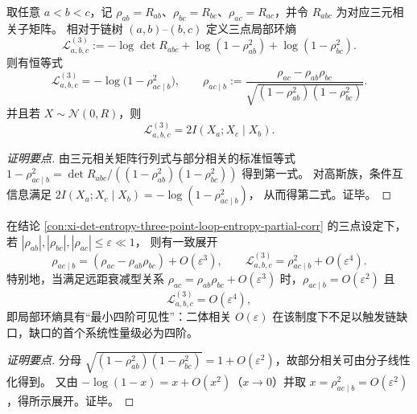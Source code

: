 \begin{conclusion}\label{con:xi-det-entropy-three-point-loop-entropy-partial-corr}
取任意 \(a<b<c\)，记 \(\rho_{ab}=R_{ab}\)、\(\rho_{bc}=R_{bc}\)、\(\rho_{ac}=R_{ac}\)，并令 \(R_{abc}\) 为对应三元相关子矩阵。
相对于链树 \((a,b)\)--\((b,c)\) 定义三点局部环熵
\[
\mathcal L^{(3)}_{a,b,c}
:=-\log\det R_{abc}+\log(1-\rho_{ab}^2)+\log(1-\rho_{bc}^2).
\]
则有恒等式
\[
\mathcal L^{(3)}_{a,b,c}
=-\log\bigl(1-\rho_{ac\mid b}^2\bigr),
\qquad
\rho_{ac\mid b}:=\frac{\rho_{ac}-\rho_{ab}\rho_{bc}}{\sqrt{(1-\rho_{ab}^2)(1-\rho_{bc}^2)}}.
\]
并且若 \(X\sim\mathcal N(0,R)\)，则
\[
\mathcal L^{(3)}_{a,b,c}=2I(X_a;X_c\mid X_b).
\]
\end{conclusion}
\begin{proof}[证明要点]
由三元相关矩阵行列式与部分相关的标准恒等式
\(
1-\rho_{ac\mid b}^2=\det R_{abc}/((1-\rho_{ab}^2)(1-\rho_{bc}^2))
\)
得到第一式。
对高斯族，条件互信息满足
\(
2I(X_a;X_c\mid X_b)=-\log(1-\rho_{ac\mid b}^2)
\)，
从而得第二式。证毕。
\end{proof}

\begin{conclusion}\label{con:xi-det-entropy-q4-trigger-weak-coherence}
在结论 \ref{con:xi-det-entropy-three-point-loop-entropy-partial-corr} 的三点设定下，若
\(
|\rho_{ab}|,|\rho_{bc}|,|\rho_{ac}|\le\varepsilon\ll1
\)，
则有一致展开
\[
\rho_{ac\mid b}=(\rho_{ac}-\rho_{ab}\rho_{bc})+O(\varepsilon^3),
\qquad
\mathcal L^{(3)}_{a,b,c}=\rho_{ac\mid b}^2+O(\varepsilon^4).
\]
特别地，当满足远距衰减型关系 \(\rho_{ac}=\rho_{ab}\rho_{bc}+O(\varepsilon^3)\) 时，\(\rho_{ac\mid b}=O(\varepsilon^2)\) 且
\[
\mathcal L^{(3)}_{a,b,c}=O(\varepsilon^4),
\]
即局部环熵具有“最小四阶可见性”：二体相关 \(O(\varepsilon)\) 在该制度下不足以触发链缺口，缺口的首个系统性量级必为四阶。
\end{conclusion}
\begin{proof}[证明要点]
分母 \(\sqrt{(1-\rho_{ab}^2)(1-\rho_{bc}^2)}=1+O(\varepsilon^2)\)，故部分相关可由分子线性化得到。
又由 \(-\log(1-x)=x+O(x^2)\)（\(x\to0\)）并取 \(x=\rho_{ac\mid b}^2=O(\varepsilon^2)\)，得所示展开。证毕。
\end{proof}

